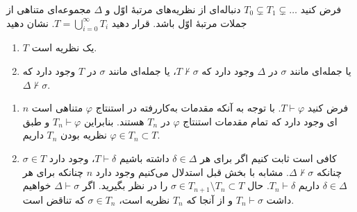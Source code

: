 فرض کنید $T_0 \varsubsetneq T_1 \varsubsetneq \dots$ دنباله‌ای از نظریه‌های مرتبهٔ اوّل و $\Delta$ مجموعه‌ای متناهی از جملات مرتبهٔ اوّل باشد. قرار دهید $T = \bigcup_{i=0}^\infty T_i$. نشان دهید
\begin{enumerate}[label=(\alph*)]
  \item $T$ یک نظریه است.
  ~
  \item یا جمله‌ای مانند $\sigma$ در $\Delta$ وجود دارد که $T \not\vdash \sigma$، یا جمله‌ای مانند $\sigma$ در $T$ وجود دارد که $\Delta \not\vdash \sigma$.
  ~
\end{enumerate}\quad
\begin{ans}
  \begin{enumerate}[label=(\alph*)]
    \item فرض کنید $T\vdash\varphi$.
    با توجه به آنکه مقدمات به‌کاررفته در استنتاج $\varphi$ متناهی است $n$ ای وجود دارد که تمام مقدمات استنتاج
    $\varphi$
    در
    $T_n$
    هستند. بنابراین
    $T_n\vdash\varphi$
    و طبق نظریه بودن $T_n$
    داریم
    $\varphi\in T_n\subset T$.
    \item کافی است ثابت کنیم اگر برای هر
    $\delta\in\Delta$ داشته باشیم
    $T\vdash\delta$،
    وجود دارد
    $\sigma\in T$
    چنانکه
    $\Delta\not\vdash\sigma$. مشابه با بخش قبل استدلال می‌کنیم وجود دارد $n$ چنانکه برای هر
    $\delta\in\Delta$
    داریم
    $T_n\vdash\delta$.
    حال $\sigma\in T_{n+1}\setminus T_n\subset T$
    را در نظر بگیرید. اگر
    $\Delta\vdash\sigma$
    خواهیم داشت
    $T_n\vdash\sigma$
    و از آنجا که
    $T_n$
    نظریه است،
    $\sigma\in T_n$
    که تناقض است.
  \end{enumerate}
\end{ans}